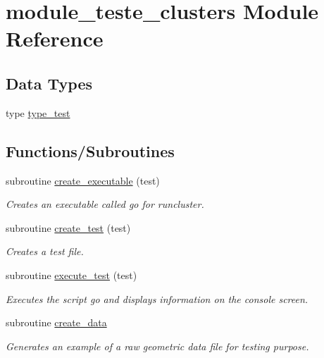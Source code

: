\hypertarget{namespacemodule__teste__clusters}{}\section{module\+\_\+teste\+\_\+clusters Module Reference}
\label{namespacemodule__teste__clusters}
\subsection*{Data Types}
\begin{DoxyCompactItemize}
\item 
type \hyperlink{structmodule__teste__clusters_1_1type__test}{type\+\_\+test}
\end{DoxyCompactItemize}
\subsection*{Functions/\+Subroutines}
\begin{DoxyCompactItemize}
\item 
subroutine \hyperlink{namespacemodule__teste__clusters_aea89e91184c2a89eec2fd785671663f9}{create\+\_\+executable} (test)
\begin{DoxyCompactList}\small\item\em Creates an executable called {\itshape go} for runcluster. \end{DoxyCompactList}\item 
subroutine \hyperlink{namespacemodule__teste__clusters_aaf3c23842ff04fc92eebd8688fe74d70}{create\+\_\+test} (test)
\begin{DoxyCompactList}\small\item\em Creates a test file. \end{DoxyCompactList}\item 
subroutine \hyperlink{namespacemodule__teste__clusters_a9ab3f7278117b04c1ba94ff7cd96e3d2}{execute\+\_\+test} (test)
\begin{DoxyCompactList}\small\item\em Executes the script {\itshape go} and displays information on the console screen. \end{DoxyCompactList}\item 
subroutine \hyperlink{namespacemodule__teste__clusters_aa745f9e68594bf01494b5de549240cf8}{create\+\_\+data}
\begin{DoxyCompactList}\small\item\em Generates an example of a raw geometric data file for testing purpose. \end{DoxyCompactList}\end{DoxyCompactItemize}


